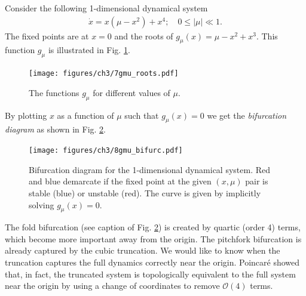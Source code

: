 \begin{ex}
	Consider the following 1-dimensional dynamical system
	\begin{align}
		\dot{x}=x(\mu -x^2)+x^4;\quad 0 \leq| \mu| \ll 1.
	\end{align}
	The fixed points are at $x=0$ and the roots of $g_\mu (x) = \mu -x^2 + x^3$. This function $g_\mu $ is illustrated in Fig. \ref{fig:gmu_roots}.
	\begin{figure}[h!]
		\centering
		\texttt{[image: figures/ch3/7gmu\_roots.pdf]}
		\caption{The functions $g_\mu $ for different values of $\mu $.}
		\label{fig:gmu_roots}
	\end{figure}
	By plotting $x$ as a function of $\mu $ such that $g_{\mu }(x)=0$ we get the \emph{bifurcation diagram} as shown in Fig. \ref{fig:gmu_bifurc}.
	\begin{figure}[h!]
		\centering
		\texttt{[image: figures/ch3/8gmu\_bifurc.pdf]}
		\caption{Bifurcation diagram for the 1-dimensional dynamical system. Red and blue demarcate if the fixed point at the given $(x, \mu)$ pair is stable (blue) or unstable (red). The curve is given by implicitly solving $g_{\mu}(x)=0$.}
		\label{fig:gmu_bifurc}
	\end{figure}

	The fold bifurcation (see caption of Fig. \ref{fig:gmu_bifurc}) is created by quartic (order 4) terms, which become more important away from the origin. The pitchfork bifurcation is already captured by the cubic truncation. We would like to know when the truncation captures the full dynamics correctly near the origin. Poincaré showed that, in fact, the truncated system is topologically equivalent to the full system near the origin by using a change of coordinates to remove $\mathcal{O}(4)$ terms.


\end{ex}
